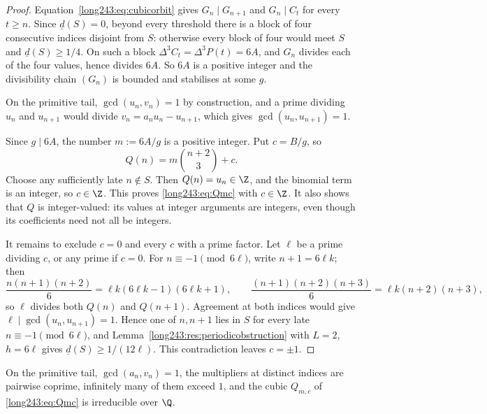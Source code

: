 \begin{proof}
Equation~\eqref{long243:eq:cubicorbit} gives $G_n\mid G_{n+1}$ and $G_n\mid C_t$ for
every $t\ge n$.  Since $\underline d(S)=0$, beyond every threshold there is a block of four
consecutive indices disjoint from $S$: otherwise every block of four would meet
$S$ and $\underline d(S)\ge1/4$.  On such a block $\Delta^3C_t=\Delta^3P(t)=6A$, and
$G_n$ divides each of the four values, hence divides $6A$.  So $6A$
is a positive integer and the divisibility chain $(G_n)$ is bounded and
stabilises at some $g$.

On the primitive tail, $\gcd(u_n,v_n)=1$ by construction, and a prime dividing
$u_n$ and $u_{n+1}$ would divide $v_n=a_nu_n-u_{n+1}$, which gives
$\gcd(u_n,u_{n+1})=1$.

Since $g\mid6A$, the number $m:=6A/g$ is a positive integer. Put
$c=B/g$, so
\[
 Q(n)=m\binom{n+2}{3}+c.
\]
Choose any sufficiently late $n\notin S$. Then $Q(n)=u_n\in\Z$, and the
binomial term is an integer, so $c\in\Z$. This proves
\eqref{long243:eq:Qmc} with $c\in\Z$. It also shows that $Q$ is
integer-valued: its values at integer arguments are integers, even
though its coefficients need not all be integers.

It remains to exclude $c=0$ and every $c$ with a prime factor.  Let $\ell$ be a
prime dividing $c$, or any prime if $c=0$.  For $n\equiv-1\pmod{6\ell}$, write
$n+1=6\ell k$; then
\[
 \frac{n(n+1)(n+2)}6=\ell k(6\ell k-1)(6\ell k+1),
 \qquad
 \frac{(n+1)(n+2)(n+3)}6=\ell k(n+2)(n+3),
\]
so $\ell$ divides both $Q(n)$ and $Q(n+1)$.  Agreement at both indices would
give $\ell\mid\gcd(u_n,u_{n+1})=1$.  Hence one of $n,n+1$ lies in $S$ for every
late $n\equiv-1\pmod{6\ell}$, and Lemma~\ref{long243:res:periodicobstruction} with
$L=2$, $h=6\ell$ gives $\underline d(S)\ge1/(12\ell)$.  This contradiction
leaves $c=\pm1$.
\end{proof}

\begin{lemma}\label{long243:res:reduciblecase}
On the primitive tail, $\gcd(a_n,v_n)=1$, the multipliers at distinct indices
are pairwise coprime, infinitely many of them exceed $1$, and the cubic
$Q_{m,c}$ of \eqref{long243:eq:Qmc} is irreducible over $\Q$.
\end{lemma}

